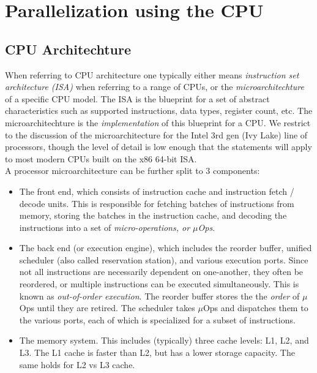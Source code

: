 \section{Parallelization using the CPU}


\subsection{CPU Architechture}

When referring to CPU architecture one typically either means 
\emph{instruction set architecture (ISA)} when referring to a range of CPUs, or the 
\emph{microarchitechture} of a specific CPU model. The ISA is the blueprint for a set of 
abstract characteristics such as supported instructions, data types, register count, etc. 
The microarchitechture is the \emph{implementation} of this blueprint for a CPU. We 
restrict to the discussion of the microarchitecture for the Intel 3rd gen (Ivy Lake) 
line of processors, though the level of detail is low enough that the statements will 
apply to most modern CPUs built on the x86 64-bit ISA. \\

A processor microarchitecture can be further split to 3 components: 

\begin{itemize}
    \item The front end, which consists of instruction cache and instruction fetch / decode 
    units. This is responsible for fetching batches of instructions from memory, storing 
    the batches in the instruction cache, and decoding the instructions into a set of 
    \emph{micro-operations, or $\mu$Ops}.
    \item The back end (or execution engine), which includes the reorder buffer, 
    unified scheduler (also called reservation station), and various execution ports. 
    Since not all instructions are necessarily dependent on one-another, they often be 
    reordered, or multiple instructions can be executed simultaneously. This is known as 
    \emph{out-of-order execution}. The reorder buffer stores the the \emph{order} of 
    $\mu$Ops until they are retired. The scheduler takes $\mu$Ops and dispatches them to 
    the various ports, each of which is specialized for a subset of instructions. 
    \item The memory system. This includes (typically) three cache levels: L1, L2, and L3.
    The L1 cache is faster than L2, but has a lower storage capacity. The same holds for 
    L2 vs L3 cache.
\end{itemize}

